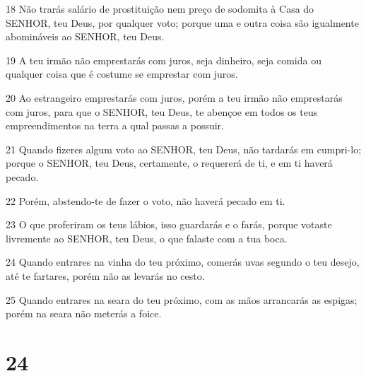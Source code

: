 \par 18 Não trarás salário de prostituição nem preço de sodomita à Casa do SENHOR, teu Deus, por qualquer voto; porque uma e outra coisa são igualmente abomináveis ao SENHOR, teu Deus.
\par 19 A teu irmão não emprestarás com juros, seja dinheiro, seja comida ou qualquer coisa que é costume se emprestar com juros.
\par 20 Ao estrangeiro emprestarás com juros, porém a teu irmão não emprestarás com juros, para que o SENHOR, teu Deus, te abençoe em todos os teus empreendimentos na terra a qual passas a possuir.
\par 21 Quando fizeres algum voto ao SENHOR, teu Deus, não tardarás em cumpri-lo; porque o SENHOR, teu Deus, certamente, o requererá de ti, e em ti haverá pecado.
\par 22 Porém, abstendo-te de fazer o voto, não haverá pecado em ti.
\par 23 O que proferiram os teus lábios, isso guardarás e o farás, porque votaste livremente ao SENHOR, teu Deus, o que falaste com a tua boca.
\par 24 Quando entrares na vinha do teu próximo, comerás uvas segundo o teu desejo, até te fartares, porém não as levarás no cesto.
\par 25 Quando entrares na seara do teu próximo, com as mãos arrancarás as espigas; porém na seara não meterás a foice.

\chapter{24}

